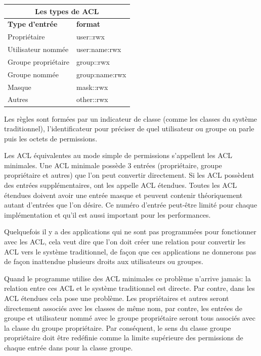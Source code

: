 \documentclass{article}
\begin{document}
\begin{center}
\begin{tabular}{|l|l|}
  \hline
    \multicolumn{2}{|c|}{Les types de ACL} \\
  \hline
\textbf{Type d'entrée} & \textbf{format} \\
  \hline
Propriétaire & user::rwx \\
Utilisateur nommée & user:name:rwx \\
Groupe propriétaire & group::rwx \\
Groupe nommée & group:name:rwx \\
Masque & mask::rwx \\
Autres & other::rwx \\
  \hline
\end{tabular}
\label{tab:entree}
\end{center}
 
Les règles sont formées par un indicateur de classe (comme les classes du système traditionnel), l'identificateur pour préciser de quel utilisateur ou groupe on parle puis les octets de permissions.

Les ACL équivalentes au mode simple de permissions s'appellent les ACL minimales. Une ACL minimale possède 3 entrées (propriétaire, groupe propriétaire et autres) que l'on peut convertir directement. Si les ACL possèdent des entrées supplémentaires, ont les appelle ACL étendues. Toutes les ACL étendues doivent avoir une entrée masque et peuvent contenir théoriquement autant d'entrées que l'on désire. Ce numéro d'entrée peut-être limité pour chaque implémentation et qu'il est aussi important pour les performances.

Quelquefois il y a des applications qui ne sont pas programmées pour fonctionner avec les ACL, cela veut dire que l'on doit créer une relation pour convertir les ACL vers le système traditionnel, de façon que ces applications ne donnerons pas de façon inattendue plusieurs droits aux utilisateurs ou groupes. 

Quand le programme utilise des ACL minimales ce problème n'arrive jamais: la relation entre ces ACL et le système traditionnel est directe. Par contre, dans les ACL étendues cela pose une problème. Les propriétaires et autres seront directement associés avec les classes de même nom, par contre, les entrées de groupe et utilisateur nommé avec le groupe propriétaire seront tous associés avec la classe du groupe propriétaire. Par conséquent, le sens du classe groupe propriétaire doit être redéfinie comme la limite supérieure des permissions de chaque entrée dans pour la classe groupe.
\end{document}
